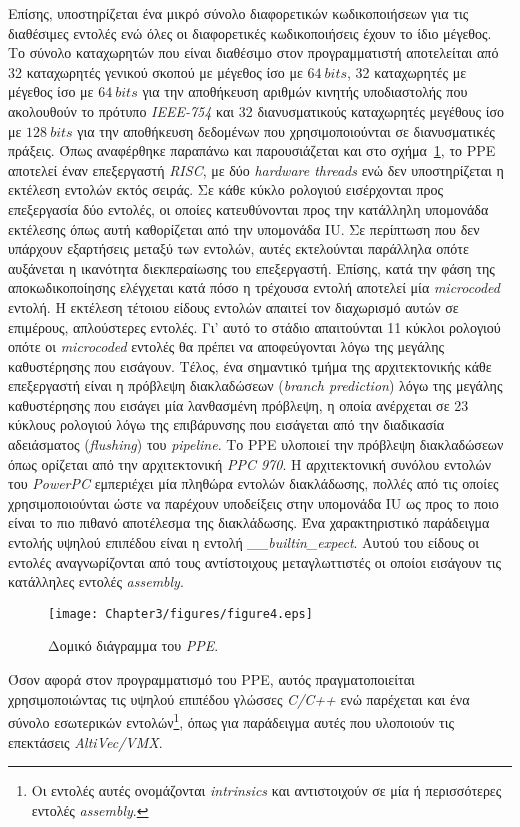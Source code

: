 Επίσης, υποστηρίζεται ένα μικρό σύνολο διαφορετικών κωδικοποιήσεων για τις διαθέσιμες εντολές ενώ όλες οι διαφορετικές κωδικοποιήσεις έχουν το ίδιο μέγεθος. Το σύνολο καταχωρητών που είναι διαθέσιμο στον προγραμματιστή αποτελείται από 32 καταχωρητές γενικού σκοπού με μέγεθος ίσο με \(64\ bits\), 32 καταχωρητές με μέγεθος ίσο με \(64\ bits\) για την αποθήκευση αριθμών κινητής υποδιαστολής που ακολουθούν το πρότυπο \textsl{IEEE-754} και 32 διανυσματικούς καταχωρητές μεγέθους ίσο με \(128\ bits\) για την αποθήκευση δεδομένων που χρησιμοποιούνται σε διανυσματικές πράξεις.\newline \indent
Όπως αναφέρθηκε παραπάνω και παρουσιάζεται και στο σχήμα~\ref{figure:fig34}, το \ac{PPE} αποτελεί έναν επεξεργαστή \textsl{RISC}, με δύο \textsl{hardware threads} ενώ δεν υποστηρίζεται η εκτέλεση εντολών εκτός σειράς. Σε κάθε κύκλο ρολογιού εισέρχονται προς επεξεργασία δύο εντολές, οι οποίες κατευθύνονται προς την κατάλληλη υπομονάδα εκτέλεσης όπως αυτή καθορίζεται από την υπομονάδα \ac{IU}. Σε περίπτωση που δεν υπάρχουν εξαρτήσεις μεταξύ των εντολών, αυτές εκτελούνται παράλληλα οπότε αυξάνεται η ικανότητα διεκπεραίωσης του επεξεργαστή. Επίσης, κατά την φάση της αποκωδικοποίησης ελέγχεται κατά πόσο η τρέχουσα εντολή αποτελεί μία \textsl{microcoded} εντολή. Η εκτέλεση τέτοιου είδους εντολών απαιτεί τον διαχωρισμό αυτών σε επιμέρους, απλούστερες εντολές. Γι' αυτό το στάδιο απαιτούνται 11 κύκλοι ρολογιού οπότε οι \textsl{microcoded} εντολές θα πρέπει να αποφεύγονται λόγω της μεγάλης καθυστέρησης που εισάγουν.\newline \indent
Τέλος, ένα σημαντικό τμήμα της αρχιτεκτονικής κάθε επεξεργαστή είναι η πρόβλεψη διακλαδώσεων (\textsl{branch prediction}) λόγω της μεγάλης καθυστέρησης που εισάγει μία λανθασμένη πρόβλεψη, η οποία ανέρχεται σε 23 κύκλους ρολογιού λόγω της επιβάρυνσης που εισάγεται από την διαδικασία αδειάσματος (\textsl{flushing}) του \textsl{pipeline}. Το \ac{PPE} υλοποιεί την πρόβλεψη διακλαδώσεων όπως ορίζεται από την αρχιτεκτονική \textsl{PPC 970}. Η αρχιτεκτονική συνόλου εντολών του \textsl{PowerPC} εμπεριέχει μία πληθώρα εντολών διακλάδωσης, πολλές από τις οποίες χρησιμοποιούνται ώστε να παρέχουν υποδείξεις στην υπομονάδα \ac{IU} ως προς το ποιο είναι το πιο πιθανό αποτέλεσμα της διακλάδωσης. Ένα χαρακτηριστικό παράδειγμα εντολής υψηλού επιπέδου είναι η εντολή \textsl{\_\_builtin\_expect}. Αυτού του είδους οι εντολές αναγνωρίζονται από τους αντίστοιχους μεταγλωττιστές οι οποίοι εισάγουν τις κατάλληλες εντολές \textsl{assembly}.
\begin{figure}[t]
\centering
\texttt{[image: Chapter3/figures/figure4.eps]}
\caption{Δομικό διάγραμμα του \textsl{PPE}.}
\label{figure:fig34}
\end{figure}
\newline \indent
Όσον αφορά στον προγραμματισμό του \ac{PPE}, αυτός πραγματοποιείται χρησιμοποιώντας τις υψηλού επιπέδου γλώσσες \textsl{C/C++} ενώ παρέχεται και ένα σύνολο εσωτερικών εντολών\footnote{\small Οι εντολές αυτές ονομάζονται \textsl{intrinsics} και αντιστοιχούν σε μία ή περισσότερες εντολές \textsl{assembly}.}, όπως για παράδειγμα αυτές που υλοποιούν τις επεκτάσεις \textsl{AltiVec/VMX}.

